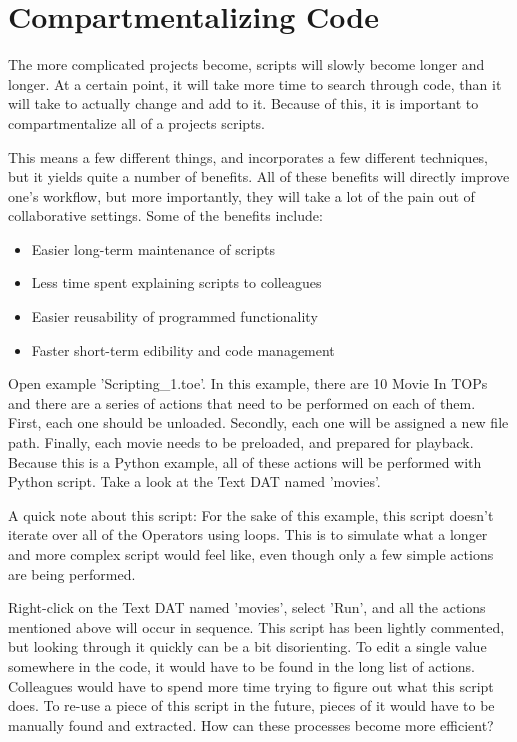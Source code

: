
\section{Compartmentalizing Code}

\begin{fullwidth}

The more complicated projects become, scripts will slowly become longer and longer. At a certain point, it will take more time to search through code, than it will take to actually change and add to it. Because of this, it is important to compartmentalize all of a projects scripts. 

This means a few different things, and incorporates a few different techniques, but it yields quite a number of benefits. All of these benefits will directly improve one's workflow, but more importantly, they will take a lot of the pain out of collaborative settings. Some of the benefits include:

\begin{itemize}
\item Easier long-term maintenance of scripts
\item Less time spent explaining scripts to colleagues
\item Easier reusability of programmed functionality
\item Faster short-term edibility and code management
\end{itemize}

Open example 'Scripting\_1.toe'. In this example, there are 10 Movie In TOPs and there are a series of actions that need to be performed on each of them. First, each one should be unloaded. Secondly, each one will be assigned a new file path. Finally, each movie needs to be preloaded, and prepared for playback. Because this is a Python example, all of these actions will be performed with Python script. Take a look at the Text DAT named 'movies'.

A quick note about this script: For the sake of this example, this script doesn't iterate over all of the Operators using loops. This is to simulate what a longer and more complex script would feel like, even though only a few simple actions are being performed.

Right-click on the Text DAT named 'movies', select 'Run', and all the actions mentioned above will occur in sequence. This script has been lightly commented, but looking through it quickly can be a bit disorienting. To edit a single value somewhere in the code, it would have to be found in the long list of actions. Colleagues would have to spend more time trying to figure out what this script does. To re-use a piece of this script in the future, pieces of it would have to be manually found and extracted. How can these processes become more efficient?


\end{fullwidth}
